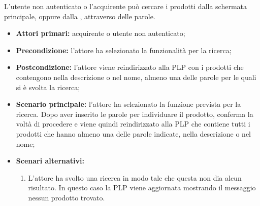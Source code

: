 
\label{ricerca-prodotti-acquirente}

L'utente non autenticato o l'acquirente può cercare i prodotti dalla schermata principale, oppure dalla , attraverso delle parole.
\begin{itemize}
    \item \textbf{Attori primari:} acquirente o utente non autenticato;
    \item \textbf{Precondizione:} l'attore ha selezionato la funzionalità per la ricerca;
    \item \textbf{Postcondizione:} l'attore viene reindirizzato alla PLP con i prodotti che contengono nella descrizione o nel nome, almeno una delle parole per le quali si è svolta la ricerca;
    \item \textbf{Scenario principale:} l'attore ha selezionato la funzione prevista per la ricerca. Dopo aver inserito le parole per individuare il prodotto, conferma la voltà di procedere e viene quindi reindirizzato alla PLP che contiene tutti i prodotti che hanno almeno una delle parole indicate, nella descrizione o nel nome;
    \item \textbf{Scenari alternativi:}
    \begin{enumerate}[label=\lett]
        \item L'attore ha svolto una ricerca in modo tale che questa non dia alcun risultato. In questo caso la PLP viene aggiornata mostrando il messaggio nessun prodotto trovato.
    \end{enumerate}
\end{itemize}


\label{filtro-prodotti-acquirente}

